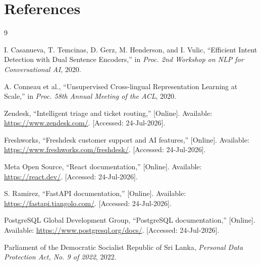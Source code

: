 \documentclass[11pt,a4paper]{article}
\begin{document}
\section{References}

\begin{thebibliography}{9}
\small

I. Casanueva, T. Temcinas, D. Gerz, M. Henderson, and I. Vulic,
``Efficient Intent Detection with Dual Sentence Encoders,''
in \textit{Proc. 2nd Workshop on NLP for Conversational AI}, 2020.

A. Conneau et al.,
``Unsupervised Cross-lingual Representation Learning at Scale,''
in \textit{Proc. 58th Annual Meeting of the ACL}, 2020.

Zendesk, ``Intelligent triage and ticket routing,'' [Online].
Available: \url{https://www.zendesk.com/}. [Accessed: 24-Jul-2026].

Freshworks, ``Freshdesk customer support and AI features,'' [Online].
Available: \url{https://www.freshworks.com/freshdesk/}. [Accessed: 24-Jul-2026].

Meta Open Source, ``React documentation,'' [Online].
Available: \url{https://react.dev/}. [Accessed: 24-Jul-2026].

S. Ramirez, ``FastAPI documentation,'' [Online].
Available: \url{https://fastapi.tiangolo.com/}. [Accessed: 24-Jul-2026].

PostgreSQL Global Development Group, ``PostgreSQL documentation,'' [Online].
Available: \url{https://www.postgresql.org/docs/}. [Accessed: 24-Jul-2026].

Parliament of the Democratic Socialist Republic of Sri Lanka,
\textit{Personal Data Protection Act, No. 9 of 2022}, 2022.

\end{thebibliography}
\end{document}
